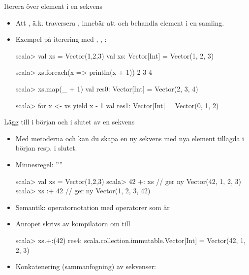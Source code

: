 \begin{Slide}{Iterera över element i en sekvens}
\begin{itemize}
\item Att  , ä.k. traversera , innebär att  och behandla element i en samling. 
\item Exempel på iterering med , , :
\begin{REPLnonum}
scala> val xs = Vector(1,2,3)
val xs: Vector[Int] = Vector(1, 2, 3)

scala> xs.foreach(x => println(x + 1)) 
2
3
4

scala> xs.map(_ + 1)
val res0: Vector[Int] = Vector(2, 3, 4)

scala> for x <- xs yield x - 1
val res1: Vector[Int] = Vector(0, 1, 2)

\end{REPLnonum}
\end{itemize}
\end{Slide}

\begin{Slide}{Lägg till i början och i slutet av en sekvens}
  \begin{itemize}
  \item Med metoderna \code{+:} och \code{:+} kan du skapa en ny sekvens med nya element tillagda i början resp. i slutet.
  \item Minnesregel: ''''
  \begin{REPLnonum}
  scala> val xs = Vector(1,2,3)
  scala> 42 +: xs         // ger ny Vector(42, 1, 2, 3)
  scala> xs :+ 42         // ger ny Vector(1, 2, 3, 42)
  \end{REPLnonum}
  \pause
  \item Semantik: operatornotation med operatorer som  är 
  \item Anropet  skrivs av kompilatorn om till 
  \begin{REPL}
  scala> xs.+:(42)
  res4: scala.collection.immutable.Vector[Int] = Vector(42, 1, 2, 3)
  \end{REPL}
  \pause
  \item Konkatenering (sammanfogning) av sekvenser: 
  
  \end{itemize}
\end{Slide}


